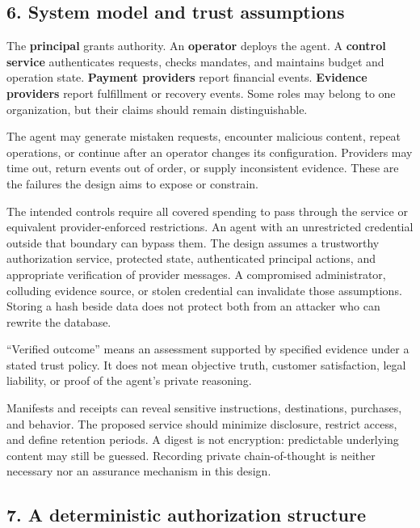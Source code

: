 \documentclass[
  11pt,
  letterpaper,
]{article}
\begin{document}
\subsection{6. System model and trust
assumptions}\label{system-model-and-trust-assumptions}

The \textbf{principal} grants authority. An \textbf{operator} deploys
the agent. A \textbf{control service} authenticates requests, checks
mandates, and maintains budget and operation state. \textbf{Payment
providers} report financial events. \textbf{Evidence providers} report
fulfillment or recovery events. Some roles may belong to one
organization, but their claims should remain distinguishable.

The agent may generate mistaken requests, encounter malicious content,
repeat operations, or continue after an operator changes its
configuration. Providers may time out, return events out of order, or
supply inconsistent evidence. These are the failures the design aims to
expose or constrain.

The intended controls require all covered spending to pass through the
service or equivalent provider-enforced restrictions. An agent with an
unrestricted credential outside that boundary can bypass them. The
design assumes a trustworthy authorization service, protected state,
authenticated principal actions, and appropriate verification of
provider messages. A compromised administrator, colluding evidence
source, or stolen credential can invalidate those assumptions. Storing a
hash beside data does not protect both from an attacker who can rewrite
the database.

``Verified outcome'' means an assessment supported by specified evidence
under a stated trust policy. It does not mean objective truth, customer
satisfaction, legal liability, or proof of the agent's private
reasoning.

Manifests and receipts can reveal sensitive instructions, destinations,
purchases, and behavior. The proposed service should minimize
disclosure, restrict access, and define retention periods. A digest is
not encryption: predictable underlying content may still be guessed.
Recording private chain-of-thought is neither necessary nor an assurance
mechanism in this design.

\subsection{7. A deterministic authorization
structure}\label{a-deterministic-authorization-structure}
\end{document}
